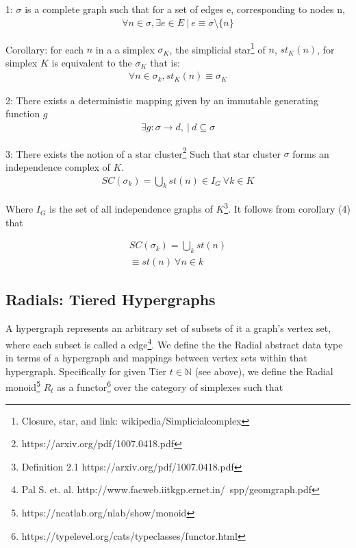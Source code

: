 \documentclass{article}
\begin{document}
1: $\sigma$ is a complete graph such that for a set of edges e, corresponding to nodes n,
\begin{equation} \label{eq1}
\begin{split}
\forall n \in \sigma, \exists e \in E \ | \ e \equiv \sigma \setminus \{n\} 
\end{split}
\end{equation}

Corollary: for each $n$ in a a simplex $\sigma_K$, the simplicial star\footnote{Closure, star, and link: wikipedia/Simplicialcomplex} of $n$, $st_K(n)$, for simplex $K$ is equivalent to the $\sigma_K$ that is:
\begin{equation} \label{eq1}
\begin{split}
\forall n \in \sigma_k, st_K(n) \equiv \sigma_K
\end{split}
\end{equation}

2: There exists a deterministic mapping given by an immutable generating function $g$
\begin{equation} \label{eq1}
\begin{split}
\exists g: \sigma \rightarrow d, \ | \ d \subseteq \sigma
\end{split}
\end{equation}

3: There exists the notion of a star cluster\footnote{https://arxiv.org/pdf/1007.0418.pdf} Such that star cluster $\sigma$ forms an independence complex of $K$.
\begin{equation} \label{eq1}
\begin{split}
SC(\sigma_k) = \bigcup_k st(n) \in I_G \ \forall k \in K
\end{split}
\end{equation}

Where $I_G$ is the set of all independence graphs of $K$\footnote{Definition 2.1 https://arxiv.org/pdf/1007.0418.pdf}. It follows from corollary (4) that

\begin{equation} \label{eq1}
\begin{split}
SC(\sigma_k) = \bigcup_k st(n) \\
\equiv st(n) \ \forall n \in k
\end{split}
\end{equation}

\subsection{Radials: Tiered Hypergraphs}
A hypergraph represents an arbitrary set of subsets of it a graph's vertex set, where each subset is called a edge\footnote{Pal S. et. al. http://www.facweb.iitkgp.ernet.in/~spp/geomgraph.pdf}. We define the the Radial abstract data type in terms of a hypergraph and mappings between vertex sets within that hypergraph. Specifically for given Tier $t \in \mathbb{N}$ (see above), we define the Radial monoid\footnote{https://ncatlab.org/nlab/show/monoid} $R_t$ as a functor\footnote{https://typelevel.org/cats/typeclasses/functor.html} over the category of simplexes such that
\end{document}
